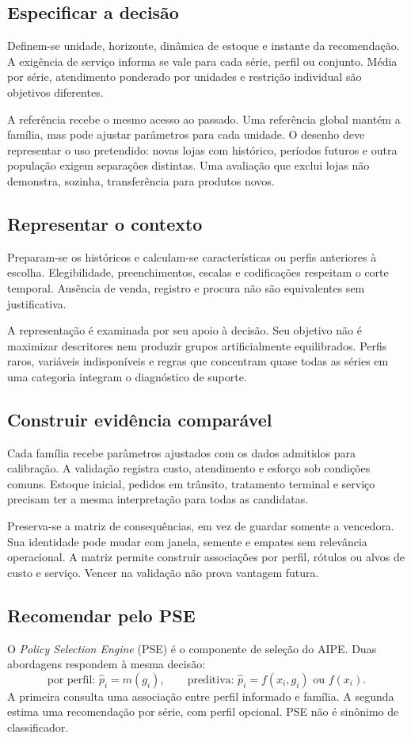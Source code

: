 \subsection{Especificar a decisão}
Definem-se unidade, horizonte, dinâmica de estoque e instante da recomendação. A exigência de serviço informa se vale para cada série, perfil ou conjunto. Média por série, atendimento ponderado por unidades e restrição individual são objetivos diferentes.

A referência recebe o mesmo acesso ao passado. Uma referência global mantém a família, mas pode ajustar parâmetros para cada unidade. O desenho deve representar o uso pretendido: novas lojas com histórico, períodos futuros e outra população exigem separações distintas. Uma avaliação que exclui lojas não demonstra, sozinha, transferência para produtos novos.

\subsection{Representar o contexto}
Preparam-se os históricos e calculam-se características ou perfis anteriores à escolha. Elegibilidade, preenchimentos, escalas e codificações respeitam o corte temporal. Ausência de venda, registro e procura não são equivalentes sem justificativa.

A representação é examinada por seu apoio à decisão. Seu objetivo não é maximizar descritores nem produzir grupos artificialmente equilibrados. Perfis raros, variáveis indisponíveis e regras que concentram quase todas as séries em uma categoria integram o diagnóstico de suporte.

\subsection{Construir evidência comparável}
Cada família recebe parâmetros ajustados com os dados admitidos para calibração. A validação registra custo, atendimento e esforço sob condições comuns. Estoque inicial, pedidos em trânsito, tratamento terminal e serviço precisam ter a mesma interpretação para todas as candidatas.

Preserva-se a matriz de consequências, em vez de guardar somente a vencedora. Sua identidade pode mudar com janela, semente e empates sem relevância operacional. A matriz permite construir associações por perfil, rótulos ou alvos de custo e serviço. Vencer na validação não prova vantagem futura.

\subsection{Recomendar pelo PSE}
O \textit{Policy Selection Engine} (PSE) é o componente de seleção do AIPE. Duas abordagens respondem à mesma decisão:
\[
 \text{por perfil: }\widehat p_i=m(g_i),\qquad
 \text{preditiva: }\widehat p_i=f(x_i,g_i)\text{ ou }f(x_i).
\]
A primeira consulta uma associação entre perfil informado e família. A segunda estima uma recomendação por série, com perfil opcional. PSE não é sinônimo de classificador.

